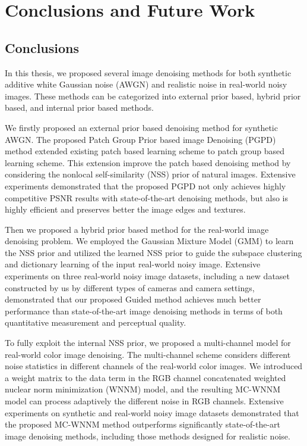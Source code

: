 %
\chapter{Conclusions and Future Work}
\label{sec:conclusions}


\section{Conclusions}
\label{sec:conclusions:sec1}
In this thesis, we proposed several image denoising methods for both synthetic additive white Gaussian noise (AWGN) and realistic noise in real-world noisy images. These methods can be categorized into external prior based, hybrid prior based, and internal prior based methods.

We firstly proposed an external prior based denoising method for synthetic AWGN. The proposed Patch Group Prior based image Denoising (PGPD) method extended existing patch based learning scheme \cite{epll} to patch group based learning scheme. This extension improve the patch based denoising method by considering the nonlocal self-similarity (NSS) prior of natural images. Extensive experiments demonstrated that the proposed PGPD not only achieves highly competitive PSNR results with state-of-the-art denoising methods, but also is highly efficient and preserves better the image edges and textures.

Then we proposed a hybrid prior based method for the real-world image denoising problem. We employed the Gaussian Mixture Model (GMM) to learn the NSS prior and utilized the learned NSS prior to guide the subspace clustering and dictionary learning of the input real-world noisy image. Extensive experiments on three real-world noisy image datasets, including a new dataset constructed by us by different types of cameras and camera settings, demonstrated that our proposed Guided method achieves much better performance than state-of-the-art image denoising methods in terms of both quantitative measurement and perceptual quality.

To fully exploit the internal NSS prior, we proposed a multi-channel model for real-world color image denoising. The multi-channel scheme considers different noise statistics in different channels of the real-world color images. We introduced a weight matrix to the data term in the RGB channel concatenated weighted nuclear norm minimization (WNNM) model, and the resulting MC-WNNM model can process adaptively the different noise in RGB channels. Extensive experiments on synthetic and real-world noisy image datasets demonstrated that the proposed MC-WNNM method outperforms significantly state-of-the-art image denoising methods, including those methods designed for realistic noise.

